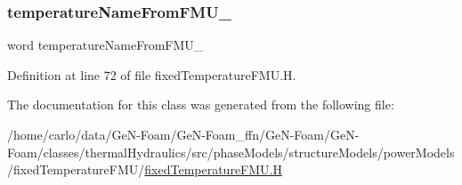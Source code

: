 \subsubsection{\texorpdfstring{temperature\+Name\+From\+F\+M\+U\+\_\+}{temperatureNameFromFMU\_}}
{\footnotesize\ttfamily word temperature\+Name\+From\+F\+M\+U\+\_\+\hspace{0.3cm}{\ttfamily [protected]}}



Definition at line 72 of file fixed\+Temperature\+F\+M\+U.\+H.



The documentation for this class was generated from the following file\+:\begin{DoxyCompactItemize}
\item 
/home/carlo/data/\+Ge\+N-\/\+Foam/\+Ge\+N-\/\+Foam\+\_\+ffn/\+Ge\+N-\/\+Foam/\+Ge\+N-\/\+Foam/classes/thermal\+Hydraulics/src/phase\+Models/structure\+Models/power\+Models/fixed\+Temperature\+F\+M\+U/\hyperlink{fixedTemperatureFMU_8H}{fixed\+Temperature\+F\+M\+U.\+H}\end{DoxyCompactItemize}
